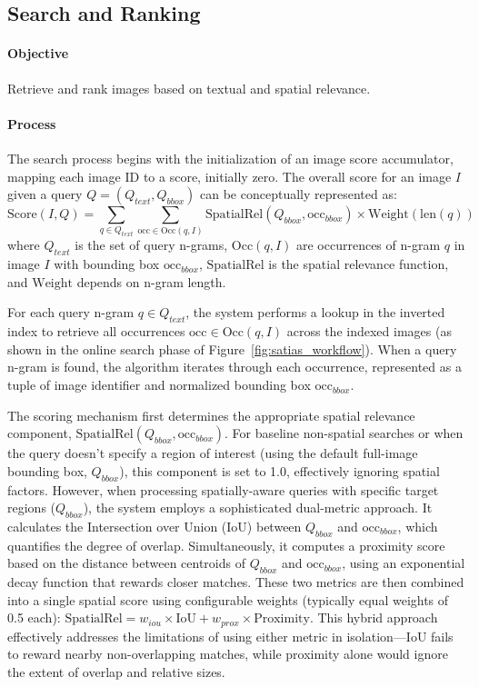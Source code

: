 \documentclass[manuscript,screen]{acmart}
\begin{document}
\subsection{Search and Ranking}

\paragraph{Objective} Retrieve and rank images based on textual and spatial relevance.

\paragraph{Process} The search process begins with the initialization of an image score accumulator, mapping each image ID to a score, initially zero. The overall score for an image $I$ given a query $Q = (Q_{text}, Q_{bbox})$ can be conceptually represented as:
\[
    \text{Score}(I, Q) = \sum_{q \in Q_{text}} \sum_{\text{occ} \in \text{Occ}(q, I)} \text{SpatialRel}(Q_{bbox}, \text{occ}_{bbox}) \times \text{Weight}(\text{len}(q))
\]
where $Q_{text}$ is the set of query n-grams, $\text{Occ}(q, I)$ are occurrences of n-gram $q$ in image $I$ with bounding box $\text{occ}_{bbox}$, $\text{SpatialRel}$ is the spatial relevance function, and $\text{Weight}$ depends on n-gram length.

For each query n-gram $q \in Q_{text}$, the system performs a lookup in the inverted index to retrieve all occurrences $\text{occ} \in \text{Occ}(q, I)$ across the indexed images (as shown in the online search phase of Figure~\ref{fig:satias_workflow}). When a query n-gram is found, the algorithm iterates through each occurrence, represented as a tuple of image identifier and normalized bounding box $\text{occ}_{bbox}$.

The scoring mechanism first determines the appropriate spatial relevance component, $\text{SpatialRel}(Q_{bbox}, \text{occ}_{bbox})$. For baseline non-spatial searches or when the query doesn't specify a region of interest (using the default full-image bounding box, $Q_{bbox}$), this component is set to 1.0, effectively ignoring spatial factors. However, when processing spatially-aware queries with specific target regions ($Q_{bbox}$), the system employs a sophisticated dual-metric approach. It calculates the Intersection over Union (IoU) between $Q_{bbox}$ and $\text{occ}_{bbox}$, which quantifies the degree of overlap. Simultaneously, it computes a proximity score based on the distance between centroids of $Q_{bbox}$ and $\text{occ}_{bbox}$, using an exponential decay function that rewards closer matches. These two metrics are then combined into a single spatial score using configurable weights (typically equal weights of 0.5 each): $\text{SpatialRel} = w_{iou} \times \text{IoU} + w_{prox} \times \text{Proximity}$. This hybrid approach effectively addresses the limitations of using either metric in isolation—IoU fails to reward nearby non-overlapping matches, while proximity alone would ignore the extent of overlap and relative sizes.
\end{document}
